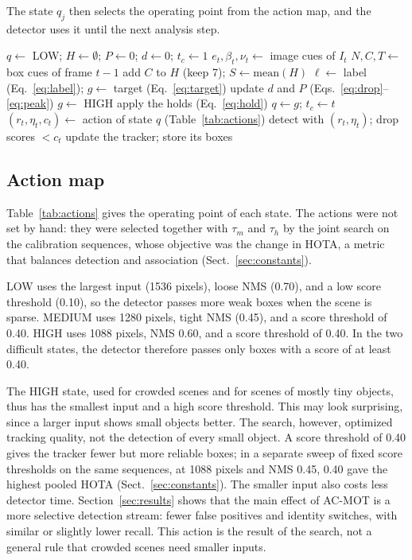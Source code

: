 \documentclass[pdflatex,sn-mathphys-num,iicol]{sn-jnl}
\begin{document}
The state $q_j$ then selects the operating point from the action map, and the
detector uses it until the next analysis step.

\begin{algorithm}[t]
\caption{AC-MOT controller for one video}\label{alg:controller}
\begin{algorithmic}[1]
\State $q\gets$ LOW; $H\gets\emptyset$; $P\gets0$; $d\gets0$; $t_c\gets1$
    \State $e_t,\beta_t,\nu_t\gets$ image cues of $I_t$
    \State $N,C,T\gets$ box cues of frame $t-1$
    \State add $C$ to $H$ (keep 7); $S\gets\mathrm{mean}(H)$
    \State $\ell\gets$ label (Eq.~\ref{eq:label}); $g\gets$ target (Eq.~\ref{eq:target})
    \State update $d$ and $P$ (Eqs.~\ref{eq:drop}--\ref{eq:peak})
     $g\gets$ HIGH
    \EndIf
    \State apply the holds (Eq.~\ref{eq:hold})
      \State $q\gets g$; $t_c\gets t$
    \EndIf
  \EndIf
  \State $(r_t,\eta_t,c_t)\gets$ action of state $q$ (Table~\ref{tab:actions})
  \State detect with $(r_t,\eta_t)$; drop scores $<c_t$
  \State update the tracker; store its boxes
\EndFor
\end{algorithmic}
\end{algorithm}

\subsection{Action map}\label{sec:actions}
Table~\ref{tab:actions} gives the operating point of each state. The actions
were not set by hand: they were selected together with $\tau_m$ and $\tau_h$
by the joint search on the calibration sequences, whose objective was the
change in HOTA, a metric that balances detection and association
(Sect.~\ref{sec:constants}).

LOW uses the largest input (1536 pixels), loose NMS (0.70), and a low score
threshold (0.10), so the detector passes more weak boxes when the scene is
sparse. MEDIUM uses 1280 pixels, tight NMS (0.45), and a score threshold of
0.40. HIGH uses 1088 pixels, NMS 0.60, and a score threshold of 0.40. In the
two difficult states, the detector therefore passes only boxes with a score of
at least 0.40.

The HIGH state, used for crowded scenes and for scenes of mostly tiny objects,
thus has the smallest input and a high score threshold. This may look
surprising, since a larger input shows small objects better. The search,
however, optimized tracking quality, not the detection of every small object.
A score threshold of 0.40 gives the tracker fewer but more reliable boxes; in
a separate sweep of fixed score thresholds on the same sequences, at 1088
pixels and NMS 0.45, 0.40 gave the highest pooled HOTA
(Sect.~\ref{sec:constants}). The smaller input also
costs less detector time. Section~\ref{sec:results} shows that the main effect
of AC-MOT is a more selective detection stream: fewer false positives and
identity switches, with similar or slightly lower recall. This action is the
result of the search, not a general rule that crowded scenes need smaller
inputs.
\end{document}
